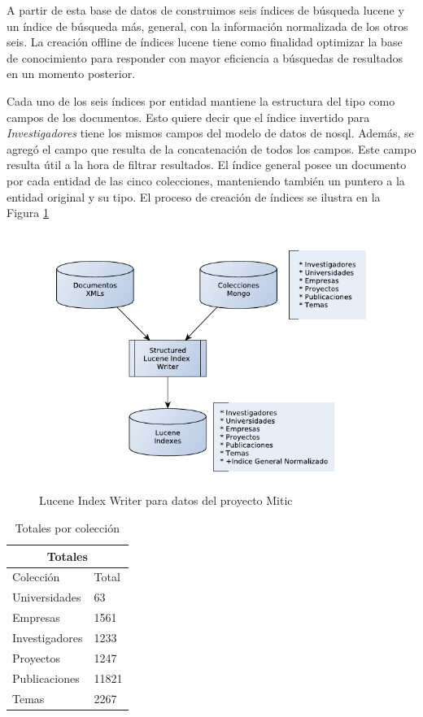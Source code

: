 A partir de esta base de datos de construimos seis índices de búsqueda lucene y un índice de búsqueda más, general, con la información normalizada de los otros seis. La creación offline de índices lucene tiene como finalidad optimizar la base de conocimiento para responder con mayor eficiencia a búsquedas de resultados en un momento posterior. 

Cada uno de los seis índices por entidad mantiene la estructura del tipo como campos de los documentos. Esto quiere decir que el índice invertido para \emph{Investigadores} tiene los mismos campos
del modelo de datos de nosql. Además, se agregó el campo  que resulta de la concatenación de todos los campos. Este campo resulta útil a la hora de filtrar resultados. El índice general posee un documento por cada entidad de las cinco colecciones, manteniendo también un puntero a la entidad original y su tipo. El proceso de creación de índices se ilustra en la Figura \ref{fig:LuceneIndexWriterEstructurado}%

 \begin{figure}[H]
   \centering
     \includegraphics{graficos/LuceneIndexWriterEstructurado}
   \caption{Lucene Index Writer para datos del proyecto Mitic}
   \label{fig:LuceneIndexWriterEstructurado}
 \end{figure}

\begin{center}
\begin{table}
\centering
\begin{tabular}{|  l | l |}
\hline
\multicolumn{2}{|c|}{Totales} \\ \hline
Colección & Total \\ \hline
Universidades & 63 \\ \hline 
Empresas & 1561\\ \hline 
Investigadores & 1233\\ \hline 
Proyectos & 1247\\ \hline 
Publicaciones & 11821\\ \hline
Temas & 2267\\ \hline  
\end{tabular}
\caption{Totales por colección}
\label{table:temas}
\end{table}
\end{center}

